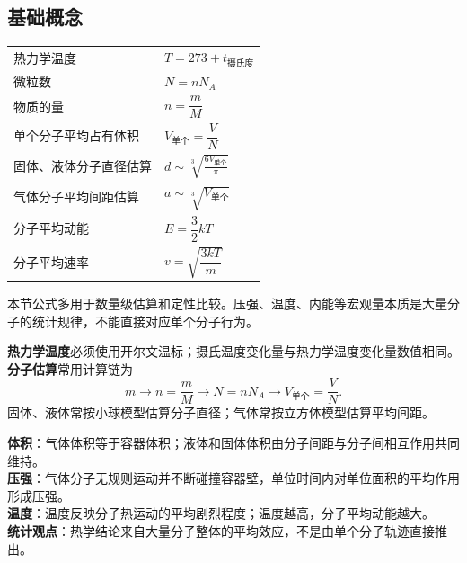 \subsection{基础概念}

\begin{tabularx}{\columnwidth}{XX}
  热力学温度&$T=273+t_{\text{摄氏度}}$\\
  微粒数&$N=nN_A$\\
  物质的量&$n=\dfrac{m}{M}$\\
  单个分子平均占有体积&$V_{\text{单个}}=\dfrac{V}{N}$\\
  固体、液体分子直径估算&$d\sim \sqrt[3]{\frac{6V_{\text{单个}}}{\pi}}$\\
  气体分子平均间距估算&$a\sim \sqrt[3]{V_{\text{单个}}}$\\
  分子平均动能&$E=\dfrac{3}{2}kT$\\
  分子平均速率&$v=\sqrt{\dfrac{3kT}{m}}$\\
\end{tabularx}

\begin{formulanotebox}
本节公式多用于数量级估算和定性比较。压强、温度、内能等宏观量本质是大量分子的统计规律，不能直接对应单个分子行为。

\textbf{热力学温度}必须使用开尔文温标；摄氏温度变化量与热力学温度变化量数值相同。\\

\textbf{分子估算}常用计算链为
\[
  m \rightarrow n=\frac{m}{M} \rightarrow N=nN_A \rightarrow V_{\text{单个}}=\frac{V}{N}.
\]
固体、液体常按小球模型估算分子直径；气体常按立方体模型估算平均间距。
\end{formulanotebox}

\begin{keypointbox}[title={\strut\textcolor{white}{\bfseries 重点知识点：宏观量的微观解释}}]
\textbf{体积}：气体体积等于容器体积；液体和固体体积由分子间距与分子间相互作用共同维持。\\

\textbf{压强}：气体分子无规则运动并不断碰撞容器壁，单位时间内对单位面积的平均作用形成压强。\\

\textbf{温度}：温度反映分子热运动的平均剧烈程度；温度越高，分子平均动能越大。\\

\textbf{统计观点}：热学结论来自大量分子整体的平均效应，不是由单个分子轨迹直接推出。\\
\end{keypointbox}

